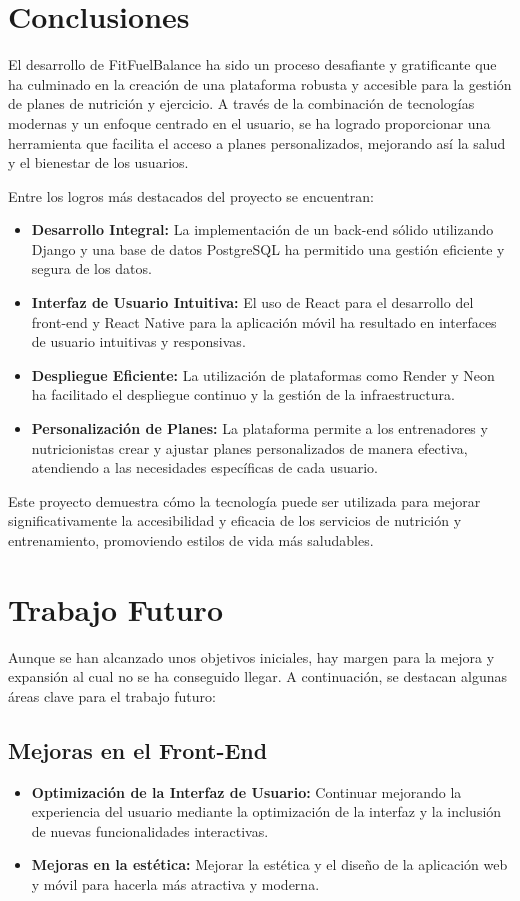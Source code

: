 \label{sec:conclusiones}

\section{Conclusiones}
El desarrollo de FitFuelBalance ha sido un proceso desafiante y gratificante que ha culminado en la creación de una plataforma robusta y accesible para la gestión de planes de nutrición y ejercicio. A través de la combinación de tecnologías modernas y un enfoque centrado en el usuario, se ha logrado proporcionar una herramienta que facilita el acceso a planes personalizados, mejorando así la salud y el bienestar de los usuarios.

Entre los logros más destacados del proyecto se encuentran:
\begin{itemize}
    \item \textbf{Desarrollo Integral:} La implementación de un back-end sólido utilizando Django y una base de datos PostgreSQL ha permitido una gestión eficiente y segura de los datos.
    \item \textbf{Interfaz de Usuario Intuitiva:} El uso de React para el desarrollo del front-end y React Native para la aplicación móvil ha resultado en interfaces de usuario intuitivas y responsivas.
    \item \textbf{Despliegue Eficiente:} La utilización de plataformas como Render y Neon ha facilitado el despliegue continuo y la gestión de la infraestructura.
    \item \textbf{Personalización de Planes:} La plataforma permite a los entrenadores y nutricionistas crear y ajustar planes personalizados de manera efectiva, atendiendo a las necesidades específicas de cada usuario.
\end{itemize}

Este proyecto demuestra cómo la tecnología puede ser utilizada para mejorar significativamente la accesibilidad y eficacia de los servicios de nutrición y entrenamiento, promoviendo estilos de vida más saludables.

\section{Trabajo Futuro}
Aunque se han alcanzado unos objetivos iniciales, hay margen para la mejora y expansión al cual no se ha conseguido llegar. A continuación, se destacan algunas áreas clave para el trabajo futuro:

\subsection{Mejoras en el Front-End}
\begin{itemize}
    \item \textbf{Optimización de la Interfaz de Usuario:} Continuar mejorando la experiencia del usuario mediante la optimización de la interfaz y la inclusión de nuevas funcionalidades interactivas.
    \item \textbf{Mejoras en la estética:} Mejorar la estética y el diseño de la aplicación web y móvil para hacerla más atractiva y moderna.
\end{itemize}

